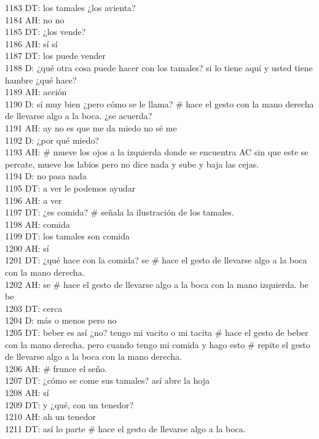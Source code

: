 1183 DT: los tamales ¿los avienta?\\
1184 AH: no no\\
1185 DT: ¿los vende?\\
1186 AH: sí sí\\
1187 DT: los puede vender\\
1188 D: ¿qué otra cosa puede hacer con los tamales? si lo tiene aquí y usted tiene hambre ¿qué hace?\\
1189 AH: acción\\
1190 D: sí muy bien ¿pero cómo se le llama? # hace el gesto con la mano derecha de llevarse algo a la boca. ¿se acuerda? \\
1191 AH: ay no es que me da miedo no sé me \\
1192 D: ¿por qué miedo?\\
1193 AH: # mueve los ojos a la izquierda donde se encuentra AC sin que este se percate, mueve los labios pero no dice nada y sube y baja las cejas.\\
1194 D: no pasa nada\\
1195 DT: a ver le podemos ayudar\\
1196 AH: a ver\\
1197 DT: ¿es comida? # señala la ilustración de los tamales.\\
1198 AH: comida\\
1199 DT: los tamales son comida\\
1200 AH: sí\\
1201 DT: ¿qué hace con la comida? se # hace el gesto de llevarse algo a la boca con la mano derecha.\\
1202 AH: se # hace el gesto de llevarse algo a la boca con la mano izquierda. be be\\
1203 DT: cerca\\
1204 D: más o menos pero no\\
1205 DT: beber es así ¿no? tengo mi vacito o mi tacita # hace el gesto de beber con la mano derecha. pero cuando tengo mi comida y hago esto # repite el gesto de llevarse algo a la boca con la mano derecha.\\
1206 AH: # frunce el seño.\\
1207 DT: ¿cómo se come sus tamales? así abre la hoja\\
1208 AH: sí\\
1209 DT: y ¿qué, con un tenedor?\\
1210 AH: ah un tenedor\\
1211 DT: así lo parte # hace el gesto de llevarse algo a la boca.\\
